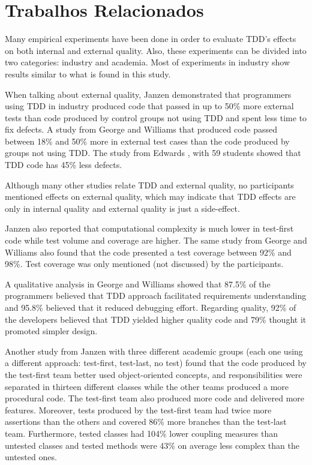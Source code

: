 \chapter{Trabalhos Relacionados}
\label{cap:trabalhos-relacionados}


Many empirical experiments have been done in order to evaluate TDD's effects on
both internal and external quality. Also, these experiments can be divided
into two categories: industry and academia. Most of experiments in industry
show results similar to what is found in this study.

When talking about external quality, Janzen \cite{janzen} demonstrated that
programmers using TDD in industry produced code that passed in up to 50\% more 
external tests than code produced by control groups not using TDD and spent less
time to fix defects. A study from George and Williams \cite{george-williams}
that produced code passed between 18\% and 50\% more in external test cases than the
code produced by groups not using TDD. The study from Edwards \cite{edwards},
with 59 students showed that TDD code has 45\% less defects.

Although many other studies relate TDD and external quality, no participants 
mentioned effects on external quality, which may indicate that TDD effects are
only in internal quality and external quality is just a side-effect.

Janzen \cite{janzen} also reported that computational complexity is much lower
in test-first code while test volume and coverage are higher. 
The same study from George and Williams also found that the code presented a
test coverage between 92\% and 98\%. Test coverage was
only mentioned (not discussed) by the participants.

A qualitative analysis in George and Williams showed that 87.5\% of the
programmers believed that TDD approach facilitated requirements 
understanding and 95.8\% believed that it reduced debugging effort. 
Regarding quality, 92\% of the developers believed that TDD yielded higher
quality code and 79\% thought it promoted simpler design.

Another study from Janzen \cite{janzen-2} with three different academic groups 
(each one using a different approach: test-first, test-last, no test) found that
the code produced by the test-first team better used object-oriented concepts,
and responsibilities were separated in thirteen different classes while the
other teams produced a more procedural code.
The test-first team also produced more code and delivered more features.
Moreover, tests produced by the test-first team had twice more assertions than
the others and covered 86\% more branches than the test-last team. Furthermore,
tested classes had 104\% lower coupling measures than untested classes and
tested methods were 43\% on average less complex than the untested ones.

